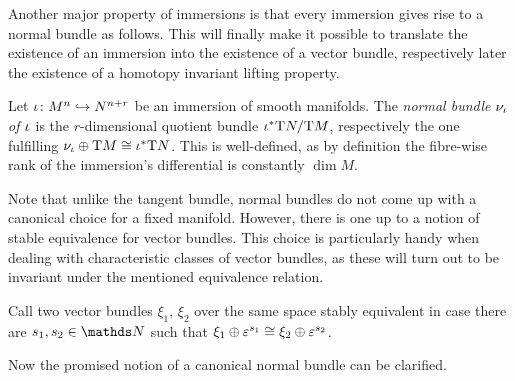 Another major property of immersions is that every immersion gives
rise to a normal bundle as follows. This will finally make it
possible to translate the existence of an immersion into the existence
of a vector bundle, respectively later the existence of a homotopy
invariant lifting property.
\begin{LemDef}
  Let ${\iota}\colon M^n\hookrightarrow N^{n+r}$ be an immersion of smooth
  manifolds.
  The \emph{normal bundle $\nu_{{\iota}}$ of ${\iota}$}
  is the $r$-dimensional quotient bundle ${{\iota}}^*\mathrm{T}N/\mathrm{T}M$,
  respectively the one fulfilling
  $\nu_{{\iota}}\oplus\mathrm{T}M\cong{{\iota}}^*\mathrm{T}N$.
  This is well-defined, as by definition the fibre-wise rank of the
  immersion's differential is constantly $\dim M$.
\end{LemDef}
Note that unlike the tangent bundle, normal bundles do
not come up with a canonical choice for a fixed manifold.
However, there is one up to a notion of stable equivalence for vector
bundles.
This choice is particularly handy when dealing with
characteristic classes of vector bundles, as these will turn out to be
invariant under the mentioned equivalence relation.
\begin{Def}
  Call two vector bundles $\xi_1$, $\xi_2$ over the same space 
  stably equivalent in case there are $s_1, s_2\in\Nat$ such that
  $\xi_1\oplus\varepsilon^{s_1}\cong\xi_2\oplus\varepsilon^{s_2}$.
\end{Def}
Now the promised notion of a canonical normal bundle can be clarified.
